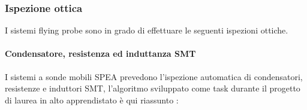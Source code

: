 \subsubsection{Ispezione ottica}
I sistemi flying probe sono in grado di effettuare le seguenti ispezioni ottiche.

\paragraph{Condensatore, resistenza ed induttanza SMT}
I sistemi a sonde mobili SPEA prevedono l’ispezione automatica di condensatori, resistenze e induttori
SMT, l’algoritmo sviluppato come task durante il progetto di laurea in alto apprendistato è qui riassunto :

\vspace{5mm}

